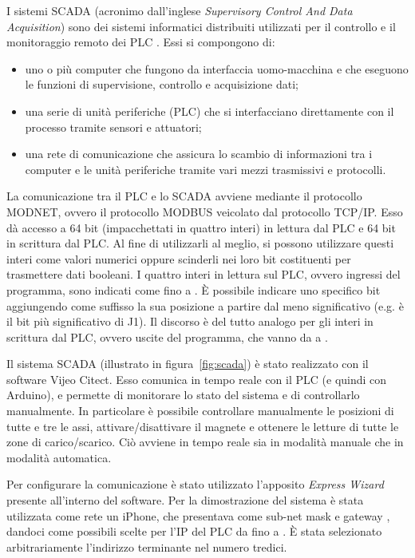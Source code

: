 I sistemi SCADA (acronimo dall'inglese \emph{Supervisory Control And Data Acquisition}) sono dei
sistemi informatici distribuiti utilizzati per il controllo e il monitoraggio remoto dei PLC
\cite{daneels_salter,ferrazza,sielco}. Essi si compongono di:
\begin{itemize}
    \item uno o più computer che fungono da interfaccia uomo-macchina e che eseguono le funzioni di
        supervisione, controllo e acquisizione dati;
    \item una serie di unità periferiche (PLC) che si interfacciano direttamente con il processo
        tramite sensori e attuatori;
    \item una rete di comunicazione che assicura lo scambio di informazioni tra i computer e le
        unità periferiche tramite vari mezzi trasmissivi e protocolli.
\end{itemize}

La comunicazione tra il PLC e lo SCADA avviene mediante il protocollo MODNET, ovvero il protocollo
MODBUS veicolato dal protocollo TCP/IP. Esso dà accesso a 64 bit (impacchettati in quattro interi)
in lettura dal PLC e 64 bit in scrittura dal PLC. Al fine di utilizzarli al meglio, si possono
utilizzare questi interi come valori numerici oppure scinderli nei loro bit costituenti per
trasmettere dati booleani. I quattro interi in lettura sul PLC, ovvero ingressi del programma, sono
indicati come  fino a . È possibile indicare uno specifico bit aggiungendo
come suffisso la sua posizione a partire dal meno significativo (e.g.\@ {} è il bit
più significativo di J1). Il discorso è del tutto analogo per gli interi in scrittura dal PLC,
ovvero uscite del programma, che vanno da  a .

Il sistema SCADA (illustrato in figura~\ref{fig:scada}) è stato realizzato con il software Vijeo
Citect. Esso comunica in tempo reale con il PLC (e quindi con Arduino), e permette di monitorare lo
stato del sistema e di controllarlo manualmente. In particolare è possibile controllare manualmente
le posizioni di tutte e tre le assi, attivare/disattivare il magnete e ottenere le letture di tutte
le zone di carico/scarico. Ciò avviene in tempo reale sia in modalità manuale che in modalità
automatica.

Per configurare la comunicazione è stato utilizzato l'apposito \emph{Express Wizard} presente
all'interno del software. Per la dimostrazione del sistema è stata utilizzata come rete un iPhone,
che presentava come sub-net mask  e gateway , dandoci come
possibili scelte per l'IP del PLC da  fino a . È stata
selezionato arbitrariamente l'indirizzo terminante nel numero tredici.

